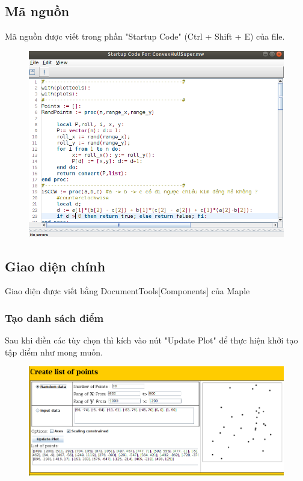 \documentclass[12pt]{article}
\begin{document}
      \subsection{Mã nguồn}  
        Mã nguồn được viết trong phần "Startup Code" (Ctrl + Shift + E)
        của file.
        \begin{figure}[h!]
          \centering
          \includegraphics[scale=0.5]{Image/codeMaple}
        \end{figure}
        \newpage
      \subsection{Giao diện chính}
        Giao diện được viết bằng DocumentTools[Components] của Maple
        \subsubsection{Tạo danh sách điểm}
          Sau khi điền các tùy chọn thì kích vào nút "Update Plot" để thực hiện khởi tạo tập điểm như mong muốn.
          \begin{figure}[h]
            \includegraphics[scale=0.4]{Image/create}
          \end{figure}
\end{document}
